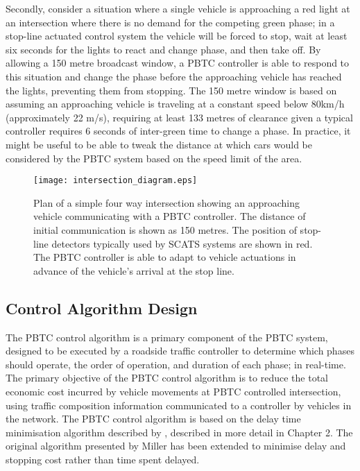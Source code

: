 Secondly, consider a situation where a single vehicle is approaching a red light at an intersection where there is no demand for the competing green phase; in a stop-line actuated control system the vehicle will be forced to stop, wait at least six seconds for the lights to react and change phase, and then take off. By allowing a 150 metre broadcast window, a PBTC controller is able to respond to this situation and change the phase before the approaching vehicle has reached the lights, preventing them from stopping. The 150 metre window is based on assuming an approaching vehicle is traveling at a constant speed below 80km/h (approximately 22 m/s), requiring at least 133 metres of clearance given a typical controller requires 6 seconds of inter-green time to change a phase. In practice, it might be useful to be able to tweak the distance at which cars would be considered by the PBTC system based on the speed limit of the area. 

\begin{figure}[]
\centering
	\texttt{[image: intersection\_diagram.eps]}
	\caption{ Plan of a simple four way intersection showing an approaching vehicle communicating with a PBTC controller. The distance of initial communication is shown as 150 metres. The position of stop-line detectors typically used by SCATS systems are shown in red. The PBTC controller is able to adapt to vehicle actuations in advance of the vehicle's arrival at the stop line. }
\label{intersectiondiagram}
\end{figure}

\subsection {Control Algorithm Design}
\label{sec:PBTCDesign}

The PBTC control algorithm is a primary component of the PBTC system, designed to be executed by a roadside traffic controller to determine which phases should operate, the order of operation, and duration of each phase; in real-time. The primary objective of the PBTC control algorithm is to reduce the total economic cost incurred by vehicle movements  at PBTC controlled intersection, using traffic composition information communicated to a controller by vehicles in the network. The PBTC control algorithm is based on the delay time minimisation algorithm described by , described in more detail in Chapter 2. The original algorithm presented by Miller has been extended to minimise delay and stopping cost rather than time spent delayed.

